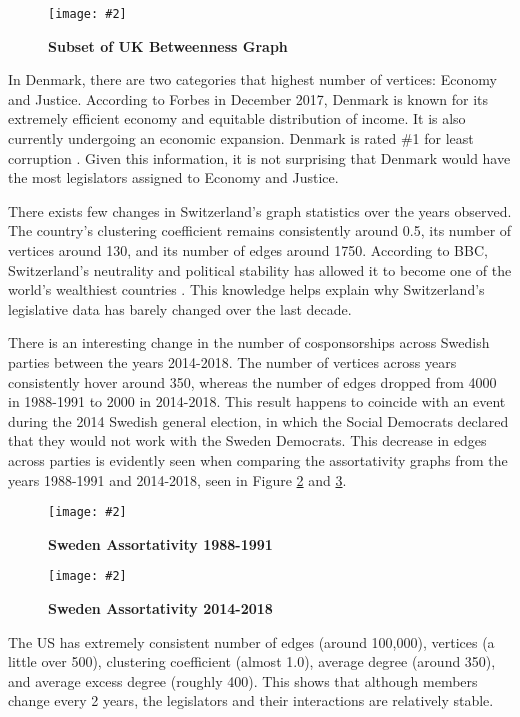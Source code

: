 \documentclass[12pt]{article}
\newcommand{\image}[4][0.6]{
  \begin{figure}[H]
    \centering
    \texttt{[image: \#2]}
    \begin{center}
      \caption[(details)]{\textbf{#4}\label{fig:#3}}
    \end{center}
    \vspace{-2em}
  \end{figure}}
\begin{document}
\begin{multicols*}{2}
\begin{center}
  \image[0.2]{Images/uk-betweenness.png}{uk-betweenness}{Subset of UK Betweenness Graph}
\end{center}

In Denmark, there are two categories that highest number of vertices: Economy and Justice. According to Forbes in December 2017, Denmark is known for its extremely efficient economy and equitable distribution of income. It is also currently undergoing an economic expansion. Denmark is rated \#1 for least corruption \cite{denmark}. Given this information, it is not surprising that Denmark would have the most legislators assigned to Economy and Justice.

There exists few changes in Switzerland's graph statistics over the years observed. The country's clustering coefficient remains consistently around 0.5, its number of vertices around 130, and its number of edges around 1750. According to BBC, Switzerland's neutrality and political stability has allowed it to become one of the world's wealthiest countries \cite{switzerland}. This knowledge helps explain why Switzerland's legislative data has barely changed over the last decade.

There is an interesting change in the number of cosponsorships across Swedish parties between the years 2014-2018. The number of vertices across years consistently hover around 350, whereas the number of edges dropped from 4000 in 1988-1991 to 2000 in 2014-2018. This result happens to coincide with an event during the 2014 Swedish general election, in which the Social Democrats declared that they would not work with the Sweden Democrats. This decrease in edges across parties is evidently seen when comparing the assortativity graphs from the years 1988-1991 and 2014-2018, seen in Figure \ref{fig:swe_ass_1988} and \ref{fig:swe_ass_2014}.

\image[0.3]{../plots/graph/sweden/assortativity/assortativity_net_se1988-1991.pdf}{swe_ass_1988}{Sweden Assortativity 1988-1991}
\image[0.3]{../plots/graph/sweden/assortativity/assortativity_net_se2014-2018.pdf}{swe_ass_2014}{Sweden Assortativity 2014-2018}

The US has extremely consistent number of edges (around 100,000), vertices (a little over 500), clustering coefficient (almost 1.0), average degree (around 350), and average excess degree (roughly 400). This shows that although members change every 2 years, the legislators and their interactions are relatively stable. 


\end{multicols*}
\end{document}

